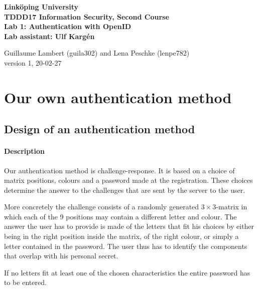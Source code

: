 \documentclass[11pt,a4paper]{article}
\begin{document}
	
\begin{center}
{\bfseries
Linköping University\\
TDDD17 Information Security, Second Course\\

Lab 1: Authentication with OpenID\\
Lab assistant: Ulf Kargén\\[10pt]}

Guillaume Lambert (guila302) and Lena Peschke (lenpe782)\\
version 1, 20-02-27
\end{center}

\hrulefill


\section*{Our own authentication method}
\subsection*{Design of an authentication method}
\paragraph{Description}

Our authentication method is challenge-response. It is based on a choice of matrix positions, colours and a password made at the registration.
These choices determine the answer to the challenges that are sent by the server to the user.

More concretely the challenge consists of a randomly generated $3\times3$-matrix in which each of the 9 positions may contain a different letter and colour.
The answer the user has to provide is made of the letters that fit his choices by either being in the right position inside the matrix, of the right colour, or simply a letter contained in the password. The user thus has to identify the components that overlap with his personal secret.

If no letters fit at least one of the chosen characteristics the entire password has to be entered.
\end{document}
